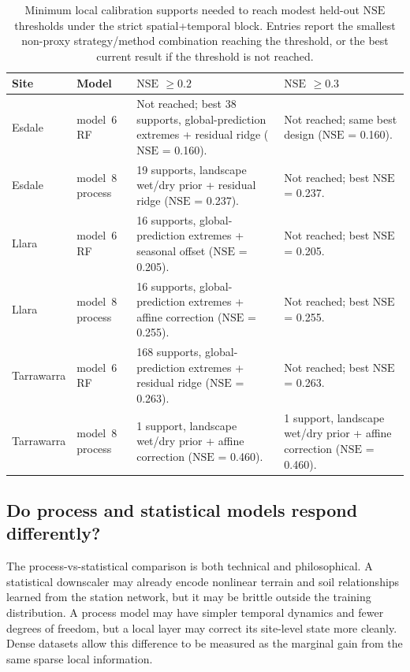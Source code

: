 \documentclass[11pt,a4paper]{article}
\newcommand{\nse}{\ensuremath{\mathrm{NSE}}}
\newcommand{\modelSix}{model~6 RF}
\newcommand{\modelEight}{model~8 process}
\begin{document}
\begin{table}[htbp]
\centering
\small
\caption{Minimum local calibration supports needed to reach modest held-out
\nse{} thresholds under the strict spatial+temporal block.  Entries report the
smallest non-proxy strategy/method combination reaching the threshold, or the
best current result if the threshold is not reached.}
\label{tab:min-budget}
\begin{tabularx}{\textwidth}{llXX}
\toprule
Site & Model & \nse{} $\geq 0.2$ & \nse{} $\geq 0.3$ \\
\midrule
Esdale & \modelSix{} &
Not reached; best 38 supports, global-prediction extremes + residual ridge
(\nse{} = 0.160). &
Not reached; same best design (\nse{} = 0.160). \\
Esdale & \modelEight{} &
19 supports, landscape wet/dry prior + residual ridge (\nse{} = 0.237). &
Not reached; best \nse{} = 0.237. \\
Llara & \modelSix{} &
16 supports, global-prediction extremes + seasonal offset (\nse{} = 0.205). &
Not reached; best \nse{} = 0.205. \\
Llara & \modelEight{} &
16 supports, global-prediction extremes + affine correction (\nse{} = 0.255). &
Not reached; best \nse{} = 0.255. \\
Tarrawarra & \modelSix{} &
168 supports, global-prediction extremes + residual ridge (\nse{} = 0.263). &
Not reached; best \nse{} = 0.263. \\
Tarrawarra & \modelEight{} &
1 support, landscape wet/dry prior + affine correction (\nse{} = 0.460). &
1 support, landscape wet/dry prior + affine correction (\nse{} = 0.460). \\
\bottomrule
\end{tabularx}
\end{table}

\subsection{Do process and statistical models respond differently?}
\label{sec:stage2-process-vs-statistical}

The process-vs-statistical comparison is both technical and philosophical.  A
statistical downscaler may already encode nonlinear terrain and soil
relationships learned from the station network, but it may be brittle outside
the training distribution.  A process model may have simpler temporal dynamics
and fewer degrees of freedom, but a local layer may correct its site-level
state more cleanly.  Dense datasets allow this difference to be measured as
the marginal gain from the same sparse local information.
\end{document}
